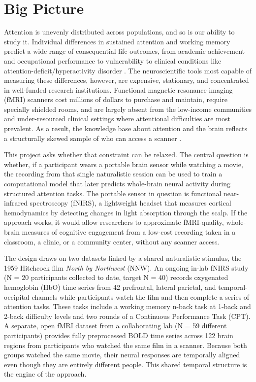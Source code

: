 \section*{Big Picture}

Attention is unevenly distributed across populations, and so is our ability to study it.
Individual differences in sustained attention and working memory predict a wide range of
consequential life outcomes, from academic achievement and occupational performance to
vulnerability to clinical conditions like attention-deficit/hyperactivity disorder
\parencite{kofler2013}. The neuroscientific tools most capable of measuring these
differences, however, are expensive, stationary, and concentrated in well-funded research
institutions. Functional magnetic resonance imaging (fMRI) scanners cost millions of
dollars to purchase and maintain, require specially shielded rooms, and are largely absent
from the low-income communities and under-resourced clinical settings where attentional
difficulties are most prevalent. As a result, the knowledge base about attention and the
brain reflects a structurally skewed sample of who can access a scanner \parencite{farah2006}.

This project asks whether that constraint can be relaxed. The central question is whether,
if a participant wears a portable brain sensor while watching a movie, the recording from
that single naturalistic session can be used to train a computational model that later
predicts whole-brain neural activity during structured attention tasks. The portable sensor
in question is functional near-infrared spectroscopy (fNIRS), a lightweight headset that
measures cortical hemodynamics by detecting changes in light absorption through the scalp.
If the approach works, it would allow researchers to approximate fMRI-quality, whole-brain
measures of cognitive engagement from a low-cost recording taken in a classroom, a clinic,
or a community center, without any scanner access.

The design draws on two datasets linked by a shared naturalistic stimulus, the 1959
Hitchcock film \textit{North by Northwest} (NNW). An ongoing in-lab fNIRS study
(N = 20 participants collected to date, target N = 40) records oxygenated hemoglobin
(HbO) time series from 42 prefrontal, lateral parietal, and temporal-occipital channels
while participants watch the film and then complete a series of attention tasks. These
tasks include a working memory n-back task at 1-back and 2-back difficulty levels and
two rounds of a Continuous Performance Task (CPT). A separate, open fMRI dataset from a
collaborating lab (N = 59 different participants) provides fully preprocessed BOLD time
series across 122 brain regions from participants who watched the same film in a scanner.
Because both groups watched the same movie, their neural responses are temporally aligned
even though they are entirely different people. This shared temporal structure is the
engine of the approach.

